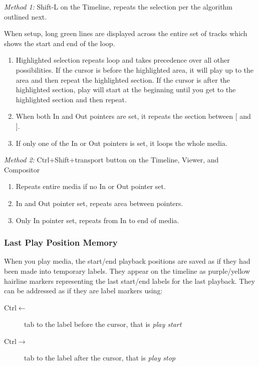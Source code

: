 \textit{Method 1:} Shift-L on the Timeline, repeats the selection per the algorithm outlined next.
  
When setup, long green lines are displayed across the entire set of tracks which shows the start and end of the loop.
\begin{enumerate}
    \item  Highlighted selection repeats loop and takes precedence over all other possibilities.  
        If the cursor is before the highlighted area, it will play up to the area and then repeat the highlighted section.  
        If the cursor is after the highlighted section, play will start at the beginning until you get to the
        highlighted section and then repeat.
    \item  When both In and Out pointers are set, it repeats the section between [ and ].
    \item  If only one of the In or Out pointers is set, it loops the whole media.
\end{enumerate}

\textit{Method 2:} Ctrl+Shift+transport button on the Timeline, Viewer, and Compositor

\begin{enumerate}
    \item Repeats entire media if no In or Out pointer set.
    \item  In and Out pointer set, repeats area between pointers.
    \item  Only In pointer set, repeats from In to end of media.
\end{enumerate}

\subsubsection*{Last Play Position Memory}%
\label{ssub:last_play_position_memory}


When you play media, the start/end playback positions are saved as if they had been made into temporary labels.  
They appear on the timeline as purple/yellow hairline markers representing the last start/end labels for the last playback. 
They can be addressed as if they are label markers using:

\begin{description}
    \item[Ctrl$\leftarrow$]   tab to the label before the cursor, that is \textit{play start}
    \item[Ctrl$\rightarrow$]   tab to the label after the cursor, that is \textit{play stop}
\end{description}


